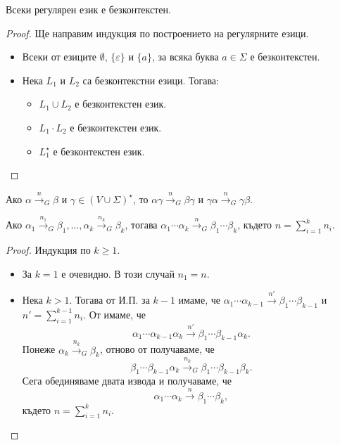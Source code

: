\begin{framed}
  \begin{thm}
    Всеки регулярен език е безконтекстен.
  \end{thm}
\end{framed}
\begin{proof}
  Ще направим индукция по построението на регулярните езици.
  \begin{itemize}
  \item
    Всеки от езиците $\emptyset$, $\{\varepsilon\}$ и $\{a\}$, за всяка буква $a \in \Sigma$ е безконтекстен.
  \item
    Нека $L_1$ и $L_2$ са безконтекстни езици. Тогава:
    \begin{itemize}
    \item
      $L_1 \cup L_2$ е безконтекстен език.
    \item
      $L_1 \cdot L_2$ е безконтекстен език.
    \item
      $L^\star_1$ е безконтекстен език.
    \end{itemize}
  \end{itemize}
\end{proof}

\begin{proposition}
  \label{pr:grammar:add}
  Ако $\alpha \stackrel{n}{\to}_G \beta$ и $\gamma \in (V \cup \Sigma)^\star$, то $\alpha\gamma \stackrel{n}{\to}_G \beta \gamma$ и $\gamma\alpha \stackrel{n}{\to}_G \gamma \beta$.
\end{proposition}

\begin{proposition}
  \label{pr:grammar:concat}
  Ако $\alpha_1 \stackrel{n_1}{\to}_G \beta_1, \dots, \alpha_k \stackrel{n_k}{\to}_G \beta_k$, тогава $\alpha_1\cdots\alpha_k \stackrel{n}{\to}_G \beta_1\cdots\beta_k$,
  където $n = \sum^k_{i=1} n_i$.
\end{proposition}
\begin{proof}
  Индукция по $k \geq 1$.
  \begin{itemize}
  \item
    За $k = 1$ е очевидно. В този случай $n_1 = n$.
  \item
   Нека $k > 1$. Тогава от И.П. за $k-1$ имаме, че
   $\alpha_1\cdots\alpha_{k-1} \stackrel{n'}{\to} \beta_1\cdots\beta_{k-1}$ и $n' = \sum^{k-1}_{i=1} n_i$.
   От  имаме, че
   \[\alpha_1\cdots\alpha_{k-1}\alpha_{k} \stackrel{n'}{\to} \beta_1\cdots\beta_{k-1}\alpha_k.\]
   Понеже $\alpha_k \stackrel{n_k}{\to}_G \beta_k$, отново от  получаваме, че
   \[\beta_1\cdots\beta_{k-1}\alpha_k \stackrel{n_k}{\to}_G \beta_1 \cdots \beta_{k-1}\beta_k.\]
   Сега обединяваме двата извода и получаваме, че
   \[\alpha_1\cdots\alpha_{k} \stackrel{n}{\to} \beta_1\cdots\beta_k,\]
   където $n = \sum^k_{i=1} n_i$.
  \end{itemize}
\end{proof}

